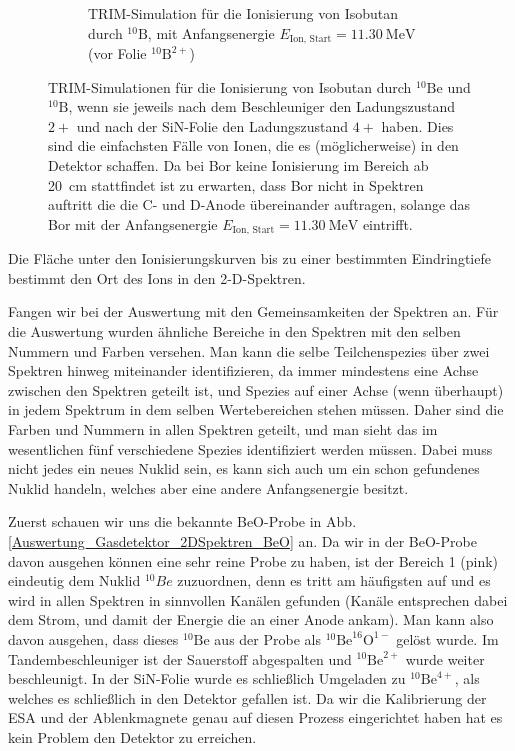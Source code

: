 \begin{figure}[H]
\begin{subfigure}[t]{0.47\textwidth}
    	\caption{TRIM-Simulation für die Ionisierung von Isobutan durch $^{10}\text{B}$, mit Anfangsenergie $E_{\text{Ion, Start}} = \SI{11.30}{\mega\electronvolt}$ (vor Folie $^{10}\text{B}^{2+}$)}
        \label{Auswertung_Gasdetektor_TRIM_sims_B}
    \end{subfigure}
    \caption{TRIM-Simulationen für die Ionisierung von Isobutan durch $^{10}\text{Be}$ und $^{10}\text{B}$, wenn sie jeweils nach dem Beschleuniger den Ladungszustand $2+$ und nach der SiN-Folie den Ladungszustand $4+$ haben. Dies sind die einfachsten Fälle von Ionen, die es (möglicherweise) in den Detektor schaffen. Da bei Bor keine Ionisierung im Bereich ab \SI{20}{\centi\metre} stattfindet ist zu erwarten, dass Bor nicht in Spektren auftritt die die C- und D-Anode übereinander auftragen, solange das Bor mit der Anfangsenergie $E_{\text{Ion, Start}} = \SI{11.30}{\mega\electronvolt}$ eintrifft.}
    \label{Auswertung_Gasdetektor_TRIM_sims}
\end{figure}
Die Fläche unter den Ionisierungskurven bis zu einer bestimmten Eindringtiefe bestimmt den Ort des Ions in den 2-D-Spektren.

Fangen wir bei der Auswertung mit den Gemeinsamkeiten der Spektren an.
Für die Auswertung wurden ähnliche Bereiche in den Spektren mit den selben Nummern und Farben versehen.
Man kann die selbe Teilchenspezies über zwei Spektren hinweg miteinander identifizieren, da immer mindestens eine Achse zwischen den Spektren geteilt ist, und Spezies auf einer Achse (wenn überhaupt) in jedem Spektrum in dem selben Wertebereichen stehen müssen.
Daher sind die Farben und Nummern in allen Spektren geteilt, und man sieht das im wesentlichen fünf verschiedene Spezies identifiziert werden müssen.
Dabei muss nicht jedes ein neues Nuklid sein, es kann sich auch um ein schon gefundenes Nuklid handeln, welches aber eine andere Anfangsenergie besitzt.

Zuerst schauen wir uns die bekannte BeO-Probe in Abb. \ref{Auswertung_Gasdetektor_2DSpektren_BeO} an.
Da wir in der BeO-Probe davon ausgehen können eine sehr reine Probe zu haben, ist der Bereich 1 (pink) eindeutig dem Nuklid $^{10}Be$ zuzuordnen, denn es tritt am häufigsten auf und es wird in allen Spektren in sinnvollen Kanälen gefunden (Kanäle entsprechen dabei dem Strom, und damit der Energie die an einer Anode ankam).
Man kann also davon ausgehen, dass dieses $^{10}\text{Be}$ aus der Probe als $^{10}\text{Be}^{16}\text{O}^{1-}$ gelöst wurde.
Im Tandembeschleuniger ist der Sauerstoff abgespalten und $^{10}\text{Be}^{2+}$ wurde weiter beschleunigt.
In der SiN-Folie wurde es schließlich Umgeladen zu $^{10}\text{Be}^{4+}$, als welches es schließlich in den Detektor gefallen ist.
Da wir die Kalibrierung der ESA und der Ablenkmagnete genau auf diesen Prozess eingerichtet haben hat es kein Problem den Detektor zu erreichen.

